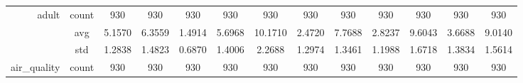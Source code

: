 \begin{table}[htbp]
{\begin{tabular}{rcccccccccccc}
                  adult                              & count                                  & 930                                                                                & 930                                                                       & 930                                                                       & 930                                                                       & 930                                           & 930                                         & 930                                            & 930                                            & 930                                            & 930                                            & 930                                            \\
                                                     & avg                                    & 5.1570                                                                             & 6.3559                                                                    & \cellcolor[rgb]{ .776,  .937,  .808}\textcolor[rgb]{ 0,  .38,  0}{1.4914} & 5.6968                                                                    & 10.1710                                       & 2.4720                                      & 7.7688                                         & 2.8237                                         & 9.6043                                         & 3.6688                                         & 9.0140                                         \\
                                                     & std                                    & 1.2838                                                                             & 1.4823                                                                    & 0.6870                                                                    & 1.4006                                                                    & 2.2688                                        & 1.2974                                      & 1.3461                                         & 1.1988                                         & 1.6718                                         & 1.3834                                         & 1.5614                                         \\
                  air\_quality                       & count                                  & 930                                                                                & 930                                                                       & 930                                                                       & 930                                                                       & 930                                           & 930                                         & 930                                            & 930                                            & 930                                            & 930                                            & 930                                            \\

\end{tabular}}
\end{table}
